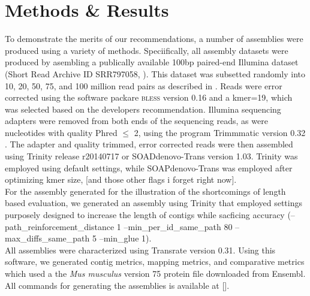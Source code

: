 \section*{Methods & Results}

To demonstrate the merits of our recommendations, a number of assemblies were produced using a variety of methods. Speciifically, all assembly datasets were produced by asembling a publically available 100bp paired-end Illumina dataset (Short Read Archive ID SRR797058, \citep{Macfarlan:2012js}). This dataset was subsetted randomly into 10, 20, 50, 75, and 100 million read pairs as described in \citep{MacManes:2014io}. Reads were error corrected using the software packare \textsc{bless} version 0.16 \citep{Heo:2014cb} and a kmer=19, which was selected based on the developers recommendation.  Illumina sequencing adapters were removed from both ends of the sequencing reads, as were nucleotides with quality Phred $\leq$ 2, using the program Trimmmatic version 0.32 \citep{Bolger:2014ek}. The adapter and quality trimmed, error corrected reads were then assembled using Trinity release r20140717 or SOADdenovo-Trans version 1.03. Trinity was employed using default settings, while SOAPdenovo-Trans was employed after optimizing kmer size, [and those other flags i forget right now]. \\

For the assembly generated for the illustration of the shortcomings of length based evaluation, we generated an assembly using Trinity that employed settings purposely designed to increase the length of contigs while sacficing accuracy (--path\_reinforcement\_distance 1 --min\_per\_id\_same\_path 80  --max\_diffs\_same\_path 5 --min\_glue 1). \\

All assemblies were characterized using Transrate version 0.31. Using this software, we generated contig metrics, mapping metrics, and comparative metrics which used a the \textit{Mus musculus} version 75 protein file downloaded from Ensembl. All commands for generating the assemblies is available at [].  